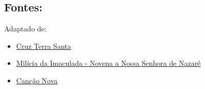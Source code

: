 \documentclass[a4paper,14pt]{extarticle} \usepackage[utf8]{inputenc}
\begin{document}
\begin{center}
\subsection*{Fontes:}
Adaptado de: 
\begin{itemize}
  \item \underline{\href{https://cruzterrasanta.com.br/historia-de-nossa-senhora-nazare/48/102}{Cruz Terra Santa}}\\
    \item \underline{\href{https://www.miliciadaimaculada.org.br/espiritualidade/santos/novena-nossa-senhora-nazare}{Milícia da Imaculada - Novena a Nossa Senhora de Nazaré}}\\
    \item \underline{\href{https://santuario.cancaonova.com/artigos-religiosos/padre-relata-sua-experiencia-com-o-cirio-de-nazare/}{Canção Nova}}\\

\end{itemize}
\end{center}
\end{document}
